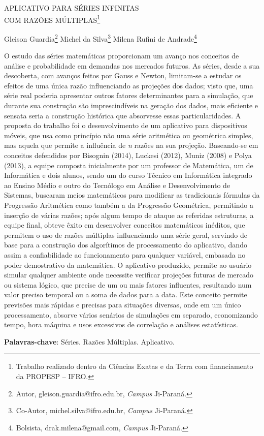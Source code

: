 \documentclass[article,12pt,onesidea,4paper,english,brazil]{abntex2}
\begin{document}
	
	
	\frenchspacing 
	
	\begin{center}
		\LARGE APLICATIVO PARA SÉRIES INFINITAS\\COM RAZÕES MÚLTIPLAS\footnote{Trabalho realizado dentro da Ciências Exatas e da Terra com financiamento da PROPESP – IFRO.}
		
		\normalsize
		Gleison Guardia\footnote{Autor, gleison.guardia@ifro.edu.br, \textit{Campus} Ji-Paraná.} 
		Michel da Silva\footnote{Co-Autor, michel.silva@ifro.edu.br, \textit{Campus} Ji-Paraná.} 
		Milena Rufini de Andrade\footnote{Bolsista, drak.milena@gmail.com, \textit{Campus} Ji-Paraná.} 
	\end{center}
	
	\noindent O estudo das séries matemáticas proporcionam um avanço nos conceitos de análise
	e probabilidade em demandas nos mercados futuros. As séries, desde a sua
	descoberta, com avanços feitos por Gauss e Newton, limitam-se a estudar os efeitos
	de uma única razão influenciando as projeções dos dados; visto que, uma série real
	poderia apresentar outros fatores determinantes para a simulação, que durante sua
	construção são imprescindíveis na geração dos dados, mais eficiente e sensata
	seria a construção histórica que absorvesse essas particularidades. A proposta do
	trabalho foi o desenvolvimento de um aplicativo para dispositivos móveis, que usa
	como princípio não uma série aritmética ou geométrica simples, mas aquela que
	permite a influência de \textit{n} razões na sua projeção. Baseando-se em conceitos
	defendidos por Bisognin (2014), Luckesi (2012), Muniz (2008) e Polya (2013), a
	equipe composta inicialmente por um professor de Matemática, um de Informática e
	dois alunos, sendo um do curso Técnico em Informática integrado ao Ensino Médio e
	outro do Tecnólogo em Análise e Desenvolvimento de Sistemas, buscaram meios
	matemáticos para modificar as tradicionais fórmulas da Progressão Aritmética como
	também a da Progressão Geométrica, permitindo a inserção de várias razões; após
	algum tempo de ataque as referidas estruturas, a equipe final, obteve êxito em
	desenvolver conceitos matemáticos inéditos, que permitem o uso de razões
	múltiplas influenciando uma série geral, servindo de base para a construção dos
	algorítimos de processamento do aplicativo, dando assim a confiabilidade ao
	funcionamento para qualquer variável, embasada no poder demostrativo da
	matemática. O aplicativo produzido, permite ao usuário simular qualquer ambiente
	onde necessite verificar projeções futuras de mercado ou sistema lógico, que precise
	de um ou mais fatores influentes, resultando num valor preciso temporal ou a soma
	de dados para a data. Este conceito permite previsões mais rápidas e precisas para
	situações diversas, onde em um único processamento, absorve vários senários de
	simulações em separado, economizando tempo, hora máquina e usos excessivos de
	correlação e análises estatísticas.
	
	\vspace{\onelineskip}
	
	\noindent
	\textbf{Palavras-chave}: Séries. Razões Múltiplas. Aplicativo.
	
\end{document}
